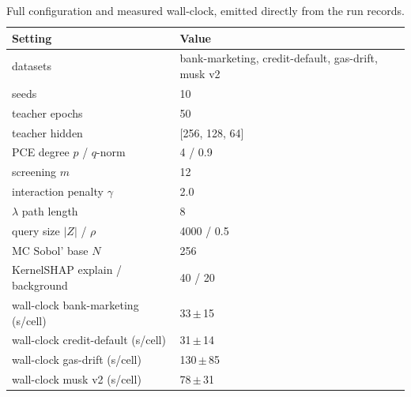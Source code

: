 \begin{table}[t]
\caption{Full configuration and measured wall-clock, emitted directly from the run records.}
\label{tab:hparams}
\begin{center}\footnotesize
\begin{tabular}{@{}ll@{}}
\toprule
\textbf{Setting} & \textbf{Value} \\
\midrule
datasets & bank-marketing, credit-default, gas-drift, musk v2 \\
seeds & 10 \\
teacher epochs & 50 \\
teacher hidden & [256, 128, 64] \\
PCE degree $p$ / $q$-norm & 4 / 0.9 \\
screening $m$ & 12 \\
interaction penalty $\gamma$ & 2.0 \\
$\lambda$ path length & 8 \\
query size $|Z|$ / $\rho$ & 4000 / 0.5 \\
MC Sobol' base $N$ & 256 \\
KernelSHAP explain / background & 40 / 20 \\
wall-clock bank-marketing (s/cell) & 33\,$\pm$\,15 \\
wall-clock credit-default (s/cell) & 31\,$\pm$\,14 \\
wall-clock gas-drift (s/cell) & 130\,$\pm$\,85 \\
wall-clock musk v2 (s/cell) & 78\,$\pm$\,31 \\
\bottomrule
\end{tabular}
\end{center}
\end{table}
